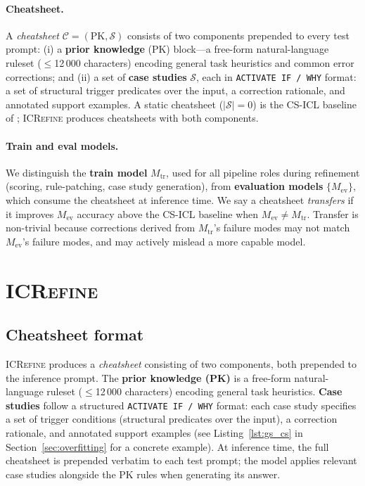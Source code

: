 \documentclass{article}
\begin{document}
\paragraph{Cheatsheet.}
A \emph{cheatsheet} $\mathcal{C} = (\text{PK}, \mathcal{S})$ consists of two components
prepended to every test prompt:
(i) a \textbf{prior knowledge} (PK) block---a free-form natural-language ruleset
($\leq$12\,000 characters) encoding general task heuristics and common error corrections;
and (ii) a set of \textbf{case studies} $\mathcal{S}$, each in \texttt{ACTIVATE~IF\,/\,WHY}
format: a set of structural trigger predicates over the input, a correction rationale, and
annotated support examples.
A static cheatsheet ($|\mathcal{S}| = 0$) is the CS-ICL baseline of \citet{csicl2024};
\textsc{ICRefine} produces cheatsheets with both components.

\paragraph{Train and eval models.}
We distinguish the \textbf{train model} $M_\text{tr}$, used for all pipeline roles during
refinement (scoring, rule-patching, case study generation), from \textbf{evaluation models}
$\{M_\text{ev}\}$, which consume the cheatsheet at inference time.
We say a cheatsheet \emph{transfers} if it improves $M_\text{ev}$ accuracy above the CS-ICL
baseline when $M_\text{ev} \neq M_\text{tr}$.
Transfer is non-trivial because corrections derived from $M_\text{tr}$'s failure modes may
not match $M_\text{ev}$'s failure modes, and may actively mislead a more capable model.




\section{\textsc{ICRefine}}
\label{sec:method}

\subsection{Cheatsheet format}
\label{sec:format}

\textsc{ICRefine} produces a \emph{cheatsheet} consisting of two components, both prepended
to the inference prompt.
The \textbf{prior knowledge (PK)} is a free-form natural-language ruleset
($\leq$12\,000 characters) encoding general task heuristics.
\textbf{Case studies} follow a structured \texttt{ACTIVATE~IF / WHY} format:
each case study specifies a set of trigger conditions (structural predicates over the input),
a correction rationale, and annotated support examples
(see Listing~\ref{lst:gs_cs} in Section~\ref{sec:overfitting} for a concrete example).
At inference time, the full cheatsheet is prepended verbatim to each test prompt; the model
applies relevant case studies alongside the PK rules when generating its answer.
\end{document}
